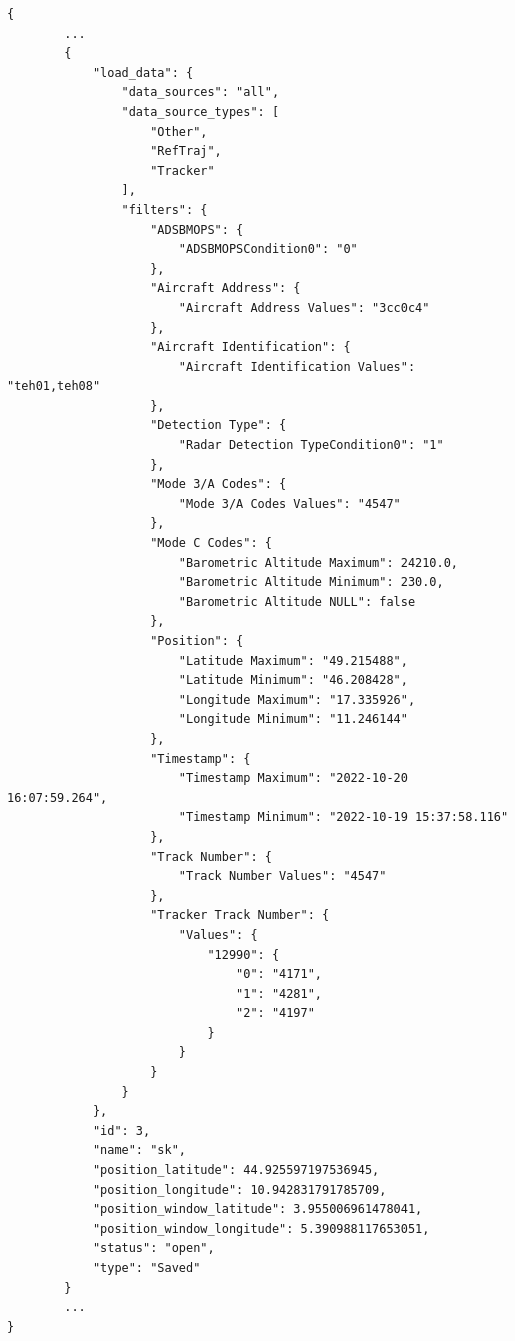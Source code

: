 \begin{lstlisting}[basicstyle=\small\ttfamily]
{
        ...
        {
            "load_data": {
                "data_sources": "all",
                "data_source_types": [
                    "Other",
                    "RefTraj",
                    "Tracker"
                ],
                "filters": {
                    "ADSBMOPS": {
                        "ADSBMOPSCondition0": "0"
                    },
                    "Aircraft Address": {
                        "Aircraft Address Values": "3cc0c4"
                    },
                    "Aircraft Identification": {
                        "Aircraft Identification Values": "teh01,teh08"
                    },
                    "Detection Type": {
                        "Radar Detection TypeCondition0": "1"
                    },
                    "Mode 3/A Codes": {
                        "Mode 3/A Codes Values": "4547"
                    },
                    "Mode C Codes": {
                        "Barometric Altitude Maximum": 24210.0,
                        "Barometric Altitude Minimum": 230.0,
                        "Barometric Altitude NULL": false
                    },
                    "Position": {
                        "Latitude Maximum": "49.215488",
                        "Latitude Minimum": "46.208428",
                        "Longitude Maximum": "17.335926",
                        "Longitude Minimum": "11.246144"
                    },
                    "Timestamp": {
                        "Timestamp Maximum": "2022-10-20 16:07:59.264",
                        "Timestamp Minimum": "2022-10-19 15:37:58.116"
                    },
                    "Track Number": {
                        "Track Number Values": "4547"
                    },
                    "Tracker Track Number": {
                        "Values": {
                            "12990": {
                                "0": "4171",
                                "1": "4281",
                                "2": "4197"
                            }
                        }
                    }
                }
            },
            "id": 3,
            "name": "sk",
            "position_latitude": 44.925597197536945,
            "position_longitude": 10.942831791785709,
            "position_window_latitude": 3.955006961478041,
            "position_window_longitude": 5.390988117653051,
            "status": "open",
            "type": "Saved"
        }
        ...
}
\end{lstlisting}

